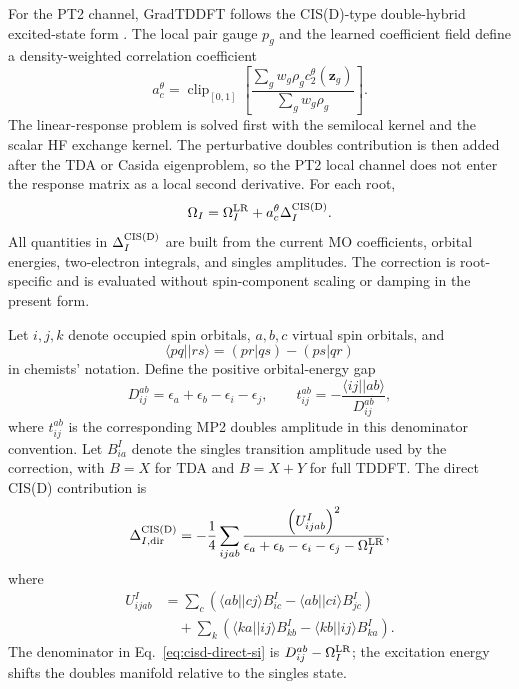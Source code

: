 For the PT2 channel, GradTDDFT follows the CIS(D)-type
double-hybrid excited-state form
\cite{HeadGordonCISD1994,GrimmeNeeseDoubleHybrid2007}. The local
pair gauge $p_g$ and the learned coefficient field define a
density-weighted correlation coefficient
\begin{equation}
  a_c^\theta
  =
  \operatorname{clip}_{[0,1]}
  \left[
  \frac{\sum_g w_g \rho_g c_2^\theta(\mathbf{z}_g)}
       {\sum_g w_g \rho_g}
  \right].
  \label{eq:pt2-scalar-correlation-si}
\end{equation}
The linear-response problem is solved first with the semilocal
kernel and the scalar HF exchange kernel. The perturbative doubles
contribution is then added after the TDA or Casida eigenproblem, so
the PT2 local channel does not enter the response matrix as a local
second derivative. For each root,
\begin{equation}
  \Omega_I
  =
  \Omega_I^{\rm LR}
  + a_c^\theta \Delta_I^{\rm CIS(D)}.
  \label{eq:pt2-cisd-corrected-root-si}
\end{equation}
All quantities in $\Delta_I^{\rm CIS(D)}$ are built from the current
MO coefficients, orbital energies, two-electron integrals, and
singles amplitudes. The correction is root-specific and is evaluated
without spin-component scaling or damping in the present form.

Let $i,j,k$ denote occupied spin orbitals, $a,b,c$ virtual spin
orbitals, and
\begin{equation}
  \langle pq||rs\rangle=(pr|qs)-(ps|qr)
  \label{eq:cisd-antisym-integral-si}
\end{equation}
in chemists' notation. Define the positive orbital-energy gap
\begin{equation}
  D_{ij}^{ab}
  =
  \epsilon_a+\epsilon_b-\epsilon_i-\epsilon_j,
  \qquad
  t_{ij}^{ab}
  =
  -\frac{\langle ij||ab\rangle}{D_{ij}^{ab}},
  \label{eq:cisd-mp2-amplitudes-si}
\end{equation}
where $t_{ij}^{ab}$ is the corresponding MP2 doubles amplitude in
this denominator convention. Let $B_{ia}^{I}$ denote the singles
transition amplitude used by the correction, with $B=X$ for TDA and
$B=X+Y$ for full TDDFT. The direct CIS(D) contribution is
\begin{equation}
  \Delta_{I,{\rm dir}}^{\rm CIS(D)}
  =
  -\frac{1}{4}
  \sum_{ijab}
  \frac{\left(U_{ijab}^{I}\right)^2}
       {\epsilon_a+\epsilon_b-\epsilon_i-\epsilon_j-\Omega_I^{\rm LR}},
  \label{eq:cisd-direct-si}
\end{equation}
where
\begin{equation}
\begin{aligned}
  U_{ijab}^{I}
  &=
  \sum_c
  \left(\langle ab||cj\rangle B_{ic}^{I}
       -\langle ab||ci\rangle B_{jc}^{I}\right)  \\
  &\quad+
  \sum_k
  \left(\langle ka||ij\rangle B_{kb}^{I}
       -\langle kb||ij\rangle B_{ka}^{I}\right).
\end{aligned}
  \label{eq:cisd-u-vector-si}
\end{equation}
The denominator in Eq.~\eqref{eq:cisd-direct-si} is
$D_{ij}^{ab}-\Omega_I^{\rm LR}$; the excitation energy shifts the
doubles manifold relative to the singles state.

